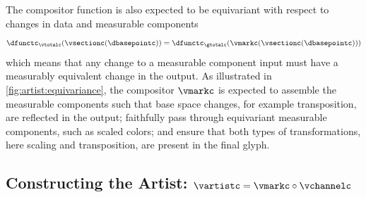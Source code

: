 \documentclass[10pt,journal,compsoc]{IEEEtran}
\theoremstyle{definition}
\theoremstyle{remark}
\begin{document}
The compositor function is also expected to be equivariant with respect to changes in data and measurable components
\begin{equation}
  \dfunctc_{\vtotalc}(\vsectionc(\dbasepointc)) = \dfunctc_{\gtotalc}(\vmarkc(\vsectionc(\dbasepointc)))  
\end{equation}
which means that any change to a measurable component input must have a measurably equivalent change in the output. As illustrated in \autoref{fig:artist:equivariance}, the compositor $\vmarkc$ is expected to assemble the measurable components such that base space changes, for example transposition, are reflected in the output; faithfully pass through equivariant measurable components, such as scaled colors; and ensure that both types of transformations, here scaling and transposition, are present in the final glyph.  


\subsection{Constructing the Artist: $\vartistc=\vmarkc\circ\vchannelc$}
\end{document}
